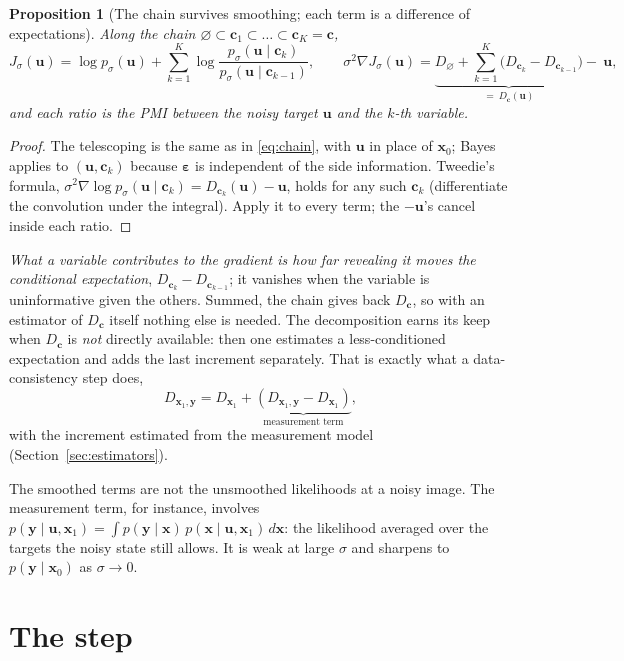 \documentclass[11pt]{article}
\newtheorem{proposition}{Proposition}
\theoremstyle{remark}
\newcommand{\x}{\bm{x}}
\newcommand{\y}{\bm{y}}
\newcommand{\uu}{\bm{u}}
\newcommand{\eps}{\bm{\varepsilon}}
\newcommand{\cc}{\bm{c}}
\newcommand{\grad}{\nabla}
\newcommand{\Dz}{D_{\varnothing}}
\newcommand{\Dg}{D_{\x_1}}
\newcommand{\Dgy}{D_{\x_1,\y}}
\begin{document}
\begin{proposition}[The chain survives smoothing; each term is a difference of expectations]
\label{prop:grad}
Along the chain $\varnothing\subset\cc_1\subset\dots\subset\cc_K = \cc$,
\begin{equation}
  J_\sigma(\uu) = \log p_\sigma(\uu)
  + \sum_{k=1}^K \log\frac{p_\sigma(\uu\mid\cc_k)}{p_\sigma(\uu\mid\cc_{k-1})},
  \qquad
  \sigma^2\grad J_\sigma(\uu) = \underbrace{\Dz + \sum_{k=1}^K\big(D_{\cc_k}-D_{\cc_{k-1}}\big)}
  _{=\ D_{\cc}(\uu)} -\ \uu ,
  \label{eq:grad}
\end{equation}
and each ratio is the PMI between the \emph{noisy} target $\uu$ and the $k$-th variable.
\end{proposition}
\begin{proof}
The telescoping is the same as in \eqref{eq:chain}, with $\uu$ in place of $\x_0$; Bayes applies
to $(\uu,\cc_k)$ because $\eps$ is independent of the side information. Tweedie's formula,
$\sigma^2\grad\log p_\sigma(\uu\mid\cc_k) = D_{\cc_k}(\uu) - \uu$, holds for any such $\cc_k$
(differentiate the convolution under the integral). Apply it to every term; the $-\uu$'s cancel
inside each ratio.
\end{proof}

\emph{What a variable contributes to the gradient is how far revealing it moves the
conditional expectation}, $D_{\cc_k} - D_{\cc_{k-1}}$; it vanishes when the variable is
uninformative given the others. Summed, the chain gives back $D_{\cc}$, so with an estimator of
$D_{\cc}$ itself nothing else is needed. The decomposition earns its keep when $D_{\cc}$ is
\emph{not} directly available: then one estimates a less-conditioned expectation and adds the
last increment separately. That is exactly what a data-consistency step does,
\[
  \Dgy = \Dg + \underbrace{(\Dgy - \Dg)}_{\text{measurement term}},
\]
with the increment estimated from the measurement model (Section~\ref{sec:estimators}).

The smoothed terms are not the unsmoothed likelihoods at a noisy image. The measurement term,
for instance, involves $p(\y\mid\uu,\x_1) = \int p(\y\mid\x)\,p(\x\mid\uu,\x_1)\,d\x$: the
likelihood averaged over the targets the noisy state still allows. It is weak at large $\sigma$
and sharpens to $p(\y\mid\x_0)$ as $\sigma\to0$.

\section{The step}
\end{document}

